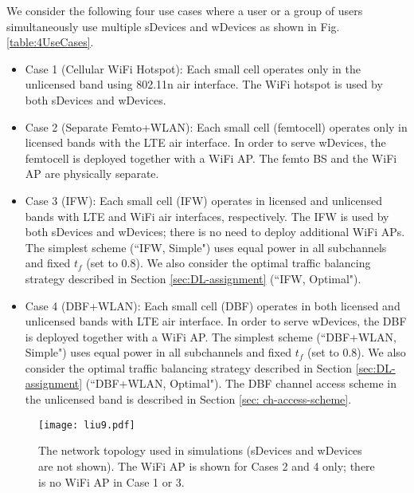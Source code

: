 \documentclass[journal,final,letterpaper,10pt,doublecolumn,twoside]{IEEEtran}
\begin{document}
We consider the following four use cases where a user or a group of users simultaneously use multiple sDevices and wDevices as shown in Fig. \ref{table:4UseCases}.
\begin{itemize}
\item   Case 1 (Cellular WiFi Hotspot): Each small cell operates
only in  the unlicensed band using 802.11n air interface. The WiFi hotspot is used by both sDevices and wDevices.



\item   Case 2 (Separate Femto+WLAN): Each small cell (femtocell) operates only
in licensed bands with the LTE air interface. In order to serve wDevices, the femtocell is deployed together with a WiFi AP. The femto BS and the WiFi AP are physically separate.

\item   Case 3 (IFW): Each small cell (IFW) \cite{femto-forum-IFW}
operates in licensed and unlicensed bands with LTE and WiFi air
interfaces, respectively. The IFW is used by both sDevices and wDevices; there is no need to deploy additional WiFi APs. The simplest scheme (``IFW, Simple") uses equal power in all subchannels and fixed $t_f$ (set to 0.8). We also consider the optimal traffic balancing strategy described in Section \ref{sec:DL-assignment} (``IFW, Optimal").

\item   Case 4 (DBF+WLAN): Each small cell (DBF)
operates in both licensed and unlicensed bands with LTE air
interface. In order to serve wDevices, the DBF is deployed together with a WiFi AP. The simplest scheme (``DBF+WLAN, Simple") uses equal power in all subchannels and fixed $t_f$ (set to 0.8). We also consider the optimal traffic balancing strategy described in Section \ref{sec:DL-assignment} (``DBF+WLAN, Optimal"). The DBF channel access scheme in the unlicensed band is described in Section \ref{sec: ch-access-scheme}.

\end{itemize}


\begin{figure}
  \center
  \texttt{[image: liu9.pdf]}
  \caption{The network topology used in simulations (sDevices and wDevices are not shown). The WiFi AP is shown for Cases 2 and 4 only; there is no WiFi AP in Case 1 or 3.} \label{fig_topology}
\end{figure}
\end{document}
